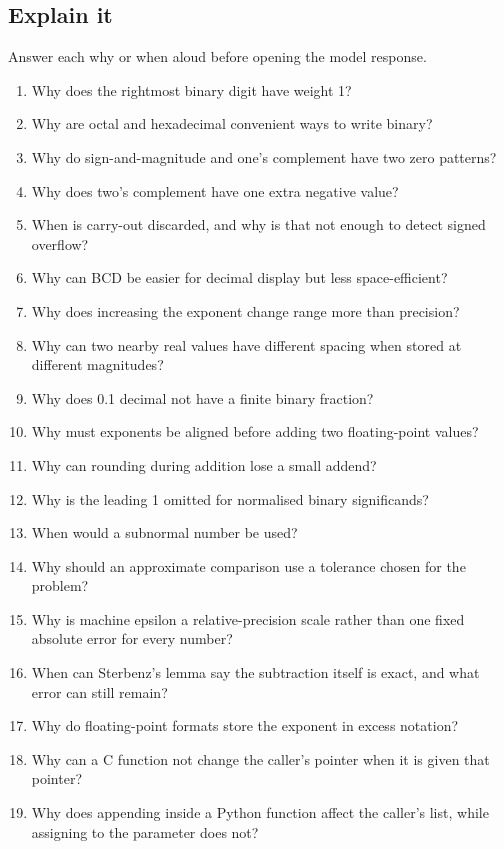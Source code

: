 \documentclass[11pt]{article}
\begin{document}
\begin{keepsection}
\section{Explain it}

Answer each why or when aloud before opening the model response.

\begin{enumerate}
\item Why does the rightmost binary digit have weight 1?
\item Why are octal and hexadecimal convenient ways to write binary?
\item Why do sign-and-magnitude and one’s complement have two zero patterns?
\item Why does two’s complement have one extra negative value?
\item When is carry-out discarded, and why is that not enough to detect signed overflow?
\item Why can BCD be easier for decimal display but less space-efficient?
\item Why does increasing the exponent change range more than precision?
\item Why can two nearby real values have different spacing when stored at different magnitudes?
\item Why does 0.1 decimal not have a finite binary fraction?
\item Why must exponents be aligned before adding two floating-point values?
\item Why can rounding during addition lose a small addend?
\item Why is the leading 1 omitted for normalised binary significands?
\item When would a subnormal number be used?
\item Why should an approximate comparison use a tolerance chosen for the problem?
\item Why is machine epsilon a relative-precision scale rather than one fixed absolute error for every number?
\item When can Sterbenz’s lemma say the subtraction itself is exact, and what error can still remain?
\item Why do floating-point formats store the exponent in excess notation?
\item Why can a C function not change the caller’s pointer when it is given that pointer?
\item Why does appending inside a Python function affect the caller’s list, while assigning to the parameter does not?

\end{enumerate}
\end{keepsection}
\end{document}
